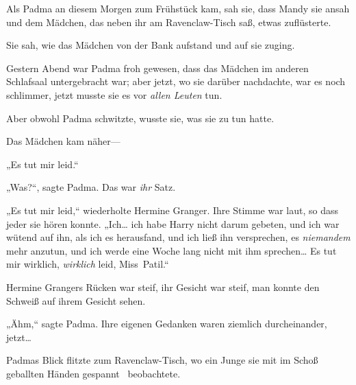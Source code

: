 \later

Als Padma an diesem Morgen zum Frühstück kam, sah sie, dass Mandy sie ansah und dem Mädchen, das neben ihr am Ravenclaw-Tisch saß, etwas zuflüsterte.

Sie sah, wie das Mädchen von der Bank aufstand und auf sie zuging.

Gestern Abend war Padma froh gewesen, dass das Mädchen im anderen Schlafsaal untergebracht war; aber jetzt, wo sie darüber nachdachte, war es noch schlimmer, jetzt musste sie es vor \emph{allen Leuten} tun.

Aber obwohl Padma schwitzte, wusste sie, was sie zu tun hatte.

Das Mädchen kam näher—

„Es tut mir leid.“

„Was?“, sagte Padma. Das war \emph{ihr} Satz.

„Es tut mir leid,“ wiederholte Hermine Granger. Ihre Stimme war laut, so dass jeder sie hören konnte. „Ich… ich habe Harry nicht darum gebeten, und ich war wütend auf ihn, als ich es herausfand, und ich ließ ihn versprechen, es \emph{niemandem} mehr anzutun, und ich werde eine Woche lang nicht mit ihm sprechen… Es tut mir wirklich, \emph{wirklich} leid, Miss~Patil.“

Hermine Grangers Rücken war steif, ihr Gesicht war steif, man konnte den Schweiß auf ihrem Gesicht sehen.

„Ähm,“ sagte Padma. Ihre eigenen Gedanken waren ziemlich durcheinander, jetzt…

Padmas Blick flitzte zum Ravenclaw-Tisch, wo ein Junge sie mit im Schoß geballten Händen gespannt ~beobachtete.


